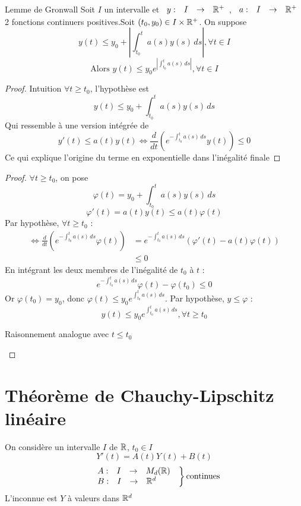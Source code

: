 \documentclass[]{report}
\begin{document}
\begin{lm}{Lemme de Gronwall}{}
    Soit $I$ un intervalle et $\begin{array}{ccccc} y : & I & \to & \mathbb{R}^+ \end{array}$, $\begin{array}{ccccc} a : & I & \to & \mathbb{R}^+ \end{array}$ 2 fonctions continuers positives.Soit $(t_0,y_0)\in I\times \mathbb{R}^+$. On suppose
    \[y(t)\le y_0+ \left|\int_{t_0}^t a(s)y(s)\,ds\right|,\forall t\in I\]
    \[\text{Alors }y(t)\le y_0 e^{\left|\int_{t_0}^t a(s)\,ds \right|},\forall t\in I\]
\end{lm}

\begin{proof}{Intuition}{}
    $\forall t\ge t_0$, l'hypothèse est
    \[y(t)\le y_0+\int_{t_0}^t a(s) y(s)\, ds\]
    Qui ressemble à une version intégrée de
    \[y'(t)\le a(t)y(t)\iff \frac{d}{dt}(e^{-\int_{t_0}^t a(s)\,ds}y(t))\le 0\]
    Ce qui explique l'origine du terme en exponentielle dans l'inégalité finale
\end{proof}

\begin{proof}{}{}
    $\forall t\ge t_0$, on pose
    \[\varphi (t)=y_0+\int_{t_0}^t a(s) y(s)\,ds\]
    \[\varphi'(t)=a(t)y(t)\le a(t)\varphi(t)\]
    Par hypothèse, $\forall t\ge t_0$ :
    \begin{align*}
        \iff \frac{d}{dt}\left(e^{-\int_{t_0}^t a(s)\,ds}\varphi(t) \right)&=e^{-\int_{t_0}^t a(s)\,ds}(\varphi'(t)-a(t)\varphi(t))\\
        &\le 0
    \end{align*}
    En intégrant les deux membres de l'inégalité de $t_0$ à $t$ :
    \[e^{-\int_{t_0}^ta(s)\,ds}\varphi(t)-\varphi(t_0)\le 0\]
    Or $\varphi(t_0)=y_0$, donc $\varphi(t)\le y_0 e^{\int_{t_0}^t a(s)\,ds}$. Par hypothèse, $y\le \varphi$ :
    \[y(t)\le y_0 e^{\int_{t_0}^t a(s)\,ds}, \forall t\ge t_0\]
    \begin{center}
        Raisonnement analogue avec $t\le t_0$
    \end{center}
\end{proof}

\section{Théorème de Chauchy-Lipschitz linéaire}

On considère un intervalle $I$ de $\mathbb{R}$, $t_0\in I$
\[Y'(t)=A(t)Y(t)+B(t)\]
\[\left.\begin{array}{ll}
    \begin{array}{ccccc} A : & I & \to & M_d(\mathbb{R}) \end{array}\\
    \begin{array}{ccccc} B : & I & \to & \mathbb{R}^d \end{array}
\end{array}\right\} \text{continues}\]
L'inconnue est $Y$ à valeurs dans $\mathbb{R}^d$
\end{document}
